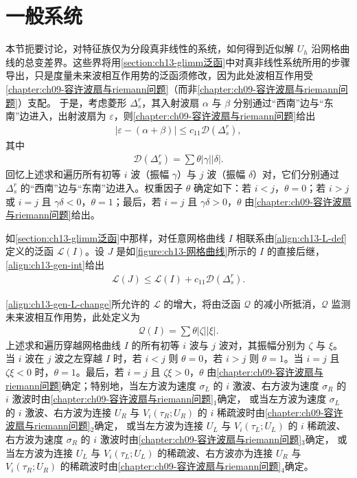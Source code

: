 \documentclass[../../main.tex]{subfiles}
\begin{document}
\section{一般系统}\label{section:ch13-一般系统}

本节扼要讨论，对特征族仅为分段真非线性的系统，如何得到近似解 $U_h$ 沿网格曲线的总变差界。这些界将用\cref{section:ch13-glimm泛函}中对真非线性系统所用的步骤导出，只是度量未来波相互作用势的泛函须修改，因为此处波相互作用受\cref{chapter:ch09-容许波扇与riemann问题}（而非\cref{chapter:ch09-容许波扇与riemann问题}）支配。
于是，考虑菱形 $\Delta_s^r$，其入射波扇 $\alpha$ 与 $\beta$ 分别通过``西南''边与``东南''边进入，出射波扇为 $\varepsilon$，则\cref{chapter:ch09-容许波扇与riemann问题}给出
\begin{align}
|\varepsilon-(\alpha+\beta)|\leqslant c_{11}\mathscr{D}(\Delta_s^r),
\label{align:ch13-gen-int}
\end{align}
其中
\begin{align}
\mathscr{D}(\Delta_s^r)=\sum\theta|\gamma||\delta|.
\label{align:ch13-gen-D}
\end{align}
回忆上述求和遍历所有初等 $i$ 波（振幅 $\gamma$）与 $j$ 波（振幅 $\delta$）对，它们分别通过 $\Delta_s^r$ 的``西南''边与``东南''边进入。权重因子 $\theta$ 确定如下：若 $i<j$，$\theta=0$；若 $i>j$ 或 $i=j$ 且 $\gamma\delta<0$，$\theta=1$；最后，若 $i=j$ 且 $\gamma\delta>0$，$\theta$ 由\cref{chapter:ch09-容许波扇与riemann问题}给出。

如\cref{section:ch13-glimm泛函}中那样，对任意网格曲线 $I$ 相联系由\eqref{align:ch13-L-def}定义的泛函 $\mathscr{L}(I)$。设 $J$ 是如\cref{figure:ch13-网格曲线}所示的 $I$ 的直接后继，\eqref{align:ch13-gen-int}给出
\begin{align}
\mathscr{L}(J)\leqslant\mathscr{L}(I)+c_{11}\mathscr{D}(\Delta_s^r).
\label{align:ch13-gen-L-change}
\end{align}

\eqref{align:ch13-gen-L-change}所允许的 $\mathscr{L}$ 的增大，将由泛函 $\mathscr{Q}$ 的减小所抵消，$\mathscr{Q}$ 监测未来波相互作用势，此处定义为
\begin{align}
\mathscr{Q}(I)=\sum\theta|\zeta||\xi|.
\label{align:ch13-gen-Q}
\end{align}
上述求和遍历穿越网格曲线 $I$ 的所有初等 $i$ 波与 $j$ 波对，其振幅分别为 $\zeta$ 与 $\xi$。当 $i$ 波在 $j$ 波之左穿越 $I$ 时，若 $i<j$ 则 $\theta=0$，若 $i>j$ 则 $\theta=1$。当 $i=j$ 且 $\zeta\xi<0$ 时，$\theta=1$。最后，若 $i=j$ 且 $\zeta\xi>0$，$\theta$ 由\cref{chapter:ch09-容许波扇与riemann问题}确定；特别地，当左方波为速度 $\sigma_L$ 的 $i$ 激波、右方波为速度 $\sigma_R$ 的 $i$ 激波时由\cref{chapter:ch09-容许波扇与riemann问题}$_1$确定，
或当左方波为速度 $\sigma_L$ 的 $i$ 激波、右方波为连接 $U_R$ 与 $V_i(\tau_R;U_R)$ 的 $i$ 稀疏波时由\cref{chapter:ch09-容许波扇与riemann问题}$_2$确定，
或当左方波为连接 $U_L$ 与 $V_i(\tau_L;U_L)$ 的 $i$ 稀疏波、右方波为速度 $\sigma_R$ 的 $i$ 激波时由\cref{chapter:ch09-容许波扇与riemann问题}$_3$确定，
或当左方波为连接 $U_L$ 与 $V_i(\tau_L;U_L)$ 的稀疏波、右方波亦为连接 $U_R$ 与 $V_i(\tau_R;U_R)$ 的稀疏波时由\cref{chapter:ch09-容许波扇与riemann问题}$_4$确定。
\end{document}
